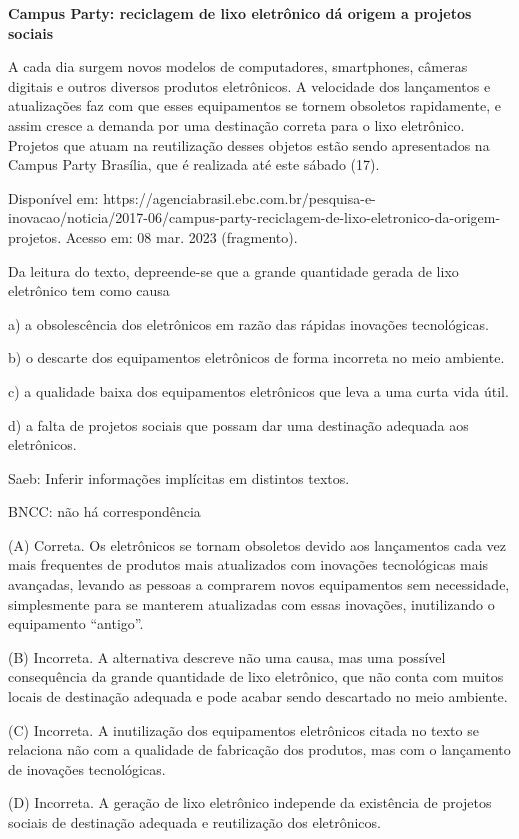 \textbf{Campus Party: reciclagem de lixo eletrônico dá origem a projetos
sociais}

A cada dia surgem novos modelos de computadores, smartphones, câmeras
digitais e outros diversos produtos eletrônicos. A velocidade dos
lançamentos e atualizações faz com que esses equipamentos se tornem
obsoletos rapidamente, e assim cresce a demanda por uma destinação
correta para o lixo eletrônico. Projetos que atuam na reutilização
desses objetos estão sendo apresentados na Campus Party Brasília, que é
realizada até este sábado (17).

Disponível em:
https://agenciabrasil.ebc.com.br/pesquisa-e-inovacao/noticia/2017-06/campus-party-reciclagem-de-lixo-eletronico-da-origem-projetos.
Acesso em: 08 mar. 2023 (fragmento).

Da leitura do texto, depreende-se que a grande quantidade gerada de lixo
eletrônico tem como causa

a) a obsolescência dos eletrônicos em razão das rápidas inovações
tecnológicas.

b) o descarte dos equipamentos eletrônicos de forma incorreta no meio
ambiente.

c) a qualidade baixa dos equipamentos eletrônicos que leva a uma curta
vida útil.

d) a falta de projetos sociais que possam dar uma destinação adequada
aos eletrônicos.

Saeb: Inferir informações implícitas em distintos textos.

BNCC: não há correspondência

(A) Correta. Os eletrônicos se tornam obsoletos devido aos lançamentos
cada vez mais frequentes de produtos mais atualizados com inovações
tecnológicas mais avançadas, levando as pessoas a comprarem novos
equipamentos sem necessidade, simplesmente para se manterem atualizadas
com essas inovações, inutilizando o equipamento ``antigo''.

(B) Incorreta. A alternativa descreve não uma causa, mas uma possível
consequência da grande quantidade de lixo eletrônico, que não conta com
muitos locais de destinação adequada e pode acabar sendo descartado no
meio ambiente.

(C) Incorreta. A inutilização dos equipamentos eletrônicos citada no
texto se relaciona não com a qualidade de fabricação dos produtos, mas
com o lançamento de inovações tecnológicas.

(D) Incorreta. A geração de lixo eletrônico independe da existência de
projetos sociais de destinação adequada e reutilização dos eletrônicos.

